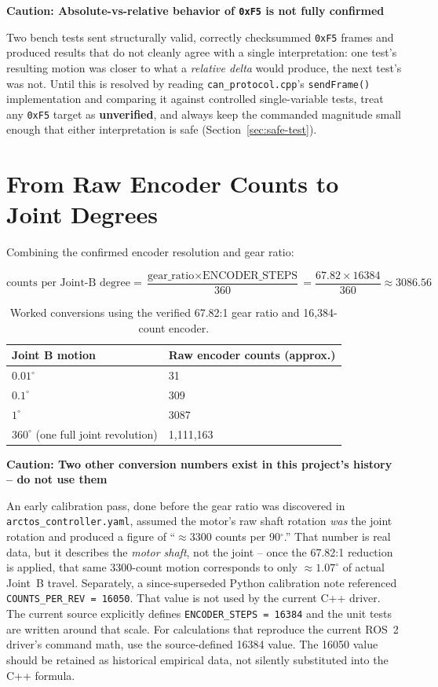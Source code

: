 \documentclass[11pt,letterpaper]{article}
\newenvironment{caution}[1]{%
    \par\addvspace{8pt}%
    \noindent{\color{cautionred}\rule{\linewidth}{0.8pt}}\par\vspace{2pt}
    \noindent\textbf{\color{cautionred}Caution: #1}\par\vspace{2pt}
}{%
    \par\vspace{2pt}\noindent{\color{cautionred}\rule{\linewidth}{0.4pt}}%
    \par\addvspace{8pt}%
}
\begin{document}
\begin{caution}{Absolute-vs-relative behavior of \texttt{0xF5} is not fully confirmed}
Two bench tests sent structurally valid, correctly checksummed \texttt{0xF5} frames and produced results that do not cleanly agree with a single interpretation: one test's resulting motion was closer to what a \emph{relative delta} would produce, the next test's was not. Until this is resolved by reading \texttt{can\_protocol.cpp}'s \texttt{sendFrame()} implementation and comparing it against controlled single-variable tests, treat any \texttt{0xF5} target as \textbf{unverified}, and always keep the commanded magnitude small enough that either interpretation is safe (Section~\ref{sec:safe-test}).
\end{caution}

\newpage
\section{From Raw Encoder Counts to Joint Degrees}

Combining the confirmed encoder resolution and gear ratio:

\[
\text{counts per Joint-B degree} = \frac{\text{gear\_ratio} \times \text{ENCODER\_STEPS}}{360} = \frac{67.82 \times 16384}{360} \approx 3086.56
\]

\begin{table}[h]
\centering
\begin{tabular}{ll}
\toprule
\textbf{Joint B motion} & \textbf{Raw encoder counts (approx.)} \\ \midrule
$0.01^\circ$ & 31 \\
$0.1^\circ$ & 309 \\
$1^\circ$ & 3087 \\
$360^\circ$ (one full joint revolution) & 1{,}111{,}163 \\ \bottomrule
\end{tabular}
\caption{Worked conversions using the verified 67.82:1 gear ratio and 16{,}384-count encoder.}
\end{table}

\begin{caution}{Two other conversion numbers exist in this project's history -- do not use them}
An early calibration pass, done before the gear ratio was discovered in \texttt{arctos\_controller.yaml}, assumed the motor's raw shaft rotation \emph{was} the joint rotation and produced a figure of ``$\approx$3300 counts per 90$^\circ$.'' That number is real data, but it describes the \emph{motor shaft}, not the joint -- once the 67.82:1 reduction is applied, that same 3300-count motion corresponds to only $\approx 1.07^\circ$ of actual Joint~B travel. Separately, a since-superseded Python calibration note referenced
\texttt{COUNTS\_PER\_REV~=~16050}.  That value is not used by the current
C++ driver.  The current source explicitly defines
\texttt{ENCODER\_STEPS~=~16384} and the unit tests are written around that
scale.  For calculations that reproduce the current ROS~2 driver's command
math, use the source-defined 16384 value.  The 16050 value should be retained
as historical empirical data, not silently substituted into the C++ formula.
\end{caution}
\end{document}
